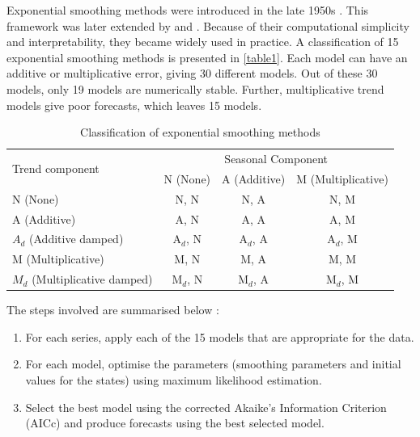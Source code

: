 \documentclass{monashthesis}
\begin{document}
Exponential smoothing methods were introduced in the late 1950s \autocites{Brown59}{Brown63}. This framework was later extended by \textcite{gardner1985exponential} and \textcite{Hyndman2002}. Because of their computational simplicity and interpretability, they became widely used in practice. A classification of 15 exponential smoothing methods is presented in \autoref{table1}. Each model can have an additive or multiplicative error, giving 30 different models. Out of these 30 models, only 19 models are numerically stable. Further, multiplicative trend models give poor forecasts, which leaves 15 models.

\begin{table}[!htp]
\centering
\caption{Classification of exponential smoothing methods}
\label{table1}
\begin{tabular}{l|ccc}
\hline
\multirow{2}{*}{Trend component} & \multicolumn{3}{c}{Seasonal Component} \\ \cline{2-4} 
                  &   N (None)    &  A (Additive)     &   M (Multiplicative)    \\ 
 N (None)                 &   N, N    &   N, A    &   N, M    \\ 
 A (Additive)                &   A, N    &   A, A    &  A, M     \\ 
 $A_d$ (Additive damped)                &  A$_d$, N     &   A$_d$, A    &    A$_d$, M   \\ 
  M (Multiplicative)                &   M, N    &    M, A   &    M, M   \\ 
  $M_d$ (Multiplicative damped)                &    M$_d$, N   &  M$_d$, A     & M$_d$, M      \\ \hline
\end{tabular}
\end{table}

The steps involved are summarised below \autocite{Hyndman2008}:

\begin{enumerate}
\def\labelenumi{\arabic{enumi}.}
\item
  For each series, apply each of the 15 models that are appropriate for the data.
\item
  For each model, optimise the parameters (smoothing parameters and initial values for the states) using maximum likelihood estimation.
\item
  Select the best model using the corrected Akaike's Information Criterion (AICc) and produce forecasts using the best selected model.
\end{enumerate}
\end{document}
